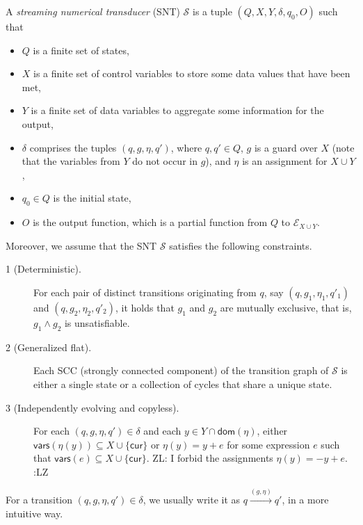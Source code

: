 \documentclass[runningheads,a4paper]{llncs}
\def\Ee{{\mathcal{E} }}
\def\Ss{{\mathcal{S} }}
\newcommand\cur{\mathsf{cur}}
\newcommand\vars{\mathsf{vars}}
\newcommand\dom{\mathsf{dom}}
\newcommand{\zhilin}[1]{\color{cyan} {ZL: #1 :LZ} \color{black}}
\begin{document}
A \emph{streaming numerical transducer} (SNT) $\Ss$ is a tuple $(Q, X, Y, \delta, q_0, O)$ such that 
\begin{itemize}
\item $Q$ is a finite set of states,
%
\item $X$ is a finite set of control variables to store some data values that have been met,
%
\item $Y$ is a finite set of data variables to aggregate some information for the output,
%
\item $\delta$ comprises the tuples $(q,  g, \eta, q')$, where $q,q'\in Q$, $g$ is a guard over $X$ (note that the variables from $Y$ do not occur in $g$), and $\eta$ is an assignment for $X \cup Y$, 
%
\item $q_0 \in Q$ is the initial state,
%
\item $O$ is the output function, which is a partial function from $Q$ to $\Ee_{X \cup Y}$.
\end{itemize}
Moreover, we assume that the SNT $\Ss$ satisfies the following constraints.
\begin{description}
\item [1 (Deterministic).] For each pair of distinct transitions originating from $q$, say $(q, g_1, \eta_1,q'_1)$ and $(q, g_2,\eta_2,q'_2)$, it holds that $g_1$ and $g_2$ are mutually exclusive, that is, $g_1 \wedge g_2$ is unsatisfiable.
%
\item [2 (Generalized flat).] Each SCC (strongly connected component) of the transition graph of $\Ss$ is either a single state or a collection of cycles that share a unique state.
%
%
\item[3 (Independently evolving and copyless).] For each $(q, g, \eta, q') \in \delta$ and each $y \in Y \cap \dom(\eta)$, either $\vars(\eta(y)) \subseteq X \cup \{\cur\}$ or $\eta(y)=y+e$ for some expression $e$ such that $\vars(e) \subseteq X \cup \{\cur\}$. \zhilin{I forbid the assignments $\eta(y)=-y+e$.}
%
\end{description}

For a transition $(q,g,\eta,q') \in \delta$, we usually write it as $q \xrightarrow{(g,\eta)} q'$, in a more intuitive way.
\end{document}
